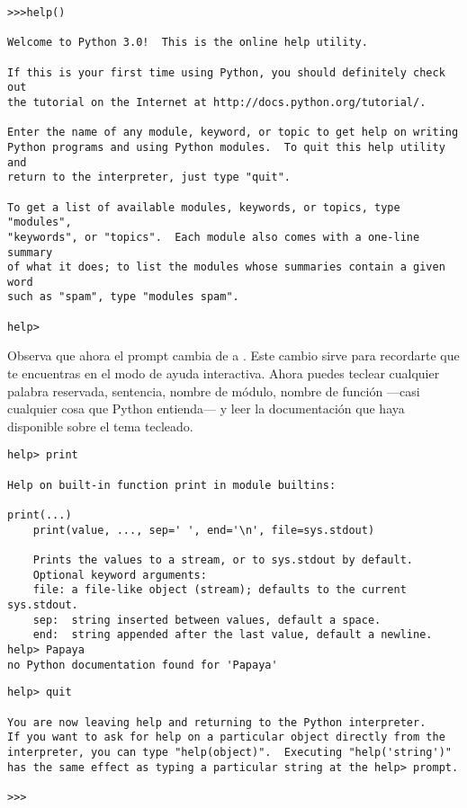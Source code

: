 \begin{listing}
\begin{verbatim}
>>>help()

Welcome to Python 3.0!  This is the online help utility.

If this is your first time using Python, you should definitely check out
the tutorial on the Internet at http://docs.python.org/tutorial/.

Enter the name of any module, keyword, or topic to get help on writing
Python programs and using Python modules.  To quit this help utility and
return to the interpreter, just type "quit".

To get a list of available modules, keywords, or topics, type "modules",
"keywords", or "topics".  Each module also comes with a one-line summary
of what it does; to list the modules whose summaries contain a given word
such as "spam", type "modules spam".

help>
\end{verbatim}
\end{listing}

Observa que ahora el prompt cambia de \codigo{$>>>$} a . Este cambio sirve para recordarte que te encuentras en el modo de ayuda interactiva. Ahora puedes teclear cualquier palabra reservada, sentencia, nombre de módulo, nombre de función ---casi cualquier cosa que Python entienda--- y leer la documentación que haya disponible sobre el tema tecleado.

\begin{listing}
\begin{verbatim}
help> print

Help on built-in function print in module builtins:

print(...)
    print(value, ..., sep=' ', end='\n', file=sys.stdout)
    
    Prints the values to a stream, or to sys.stdout by default.
    Optional keyword arguments:
    file: a file-like object (stream); defaults to the current sys.stdout.
    sep:  string inserted between values, default a space.
    end:  string appended after the last value, default a newline.
help> Papaya
no Python documentation found for 'Papaya'
\end{verbatim}
\end{listing}
\begin{listing}
\begin{verbatim}
help> quit

You are now leaving help and returning to the Python interpreter.
If you want to ask for help on a particular object directly from the
interpreter, you can type "help(object)".  Executing "help('string')"
has the same effect as typing a particular string at the help> prompt.

>>>
\end{verbatim}
\end{listing}

